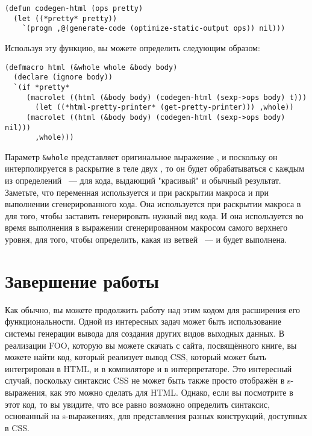 \begin{lstlisting}
(defun codegen-html (ops pretty)
  (let ((*pretty* pretty))
    `(progn ,@(generate-code (optimize-static-output ops)) nil)))
\end{lstlisting}

Используя эту функцию, вы можете определить  следующим образом:

\begin{lstlisting}
(defmacro html (&whole whole &body body)
  (declare (ignore body))
  `(if *pretty*
     (macrolet ((html (&body body) (codegen-html (sexp->ops body) t)))
       (let ((*html-pretty-printer* (get-pretty-printer))) ,whole))
     (macrolet ((html (&body body) (codegen-html (sexp->ops body) nil)))
       ,whole)))
\end{lstlisting}

Параметр \lstinline!&whole! представляет оригинальное выражение , и поскольку
он интерполируется в раскрытие в теле двух , то он будет обрабатываться с
каждым из определений ~--- для кода, выдающий "красивый" и обычный результат.
Заметьте, что переменная  используется и при раскрытии макроса и при
выполнении сгенерированного кода.  Она используется при раскрытии макроса в
 для того, чтобы заставить  генерировать нужный вид
кода.  И она используется во время выполнения в выражении  сгенерированном
макросом  самого верхнего уровня, для того, чтобы определить, какая из ветвей
~---  и  будет выполнена.

\section{Завершение работы}

Как обычно, вы можете продолжить работу над этим кодом для расширения его
функциональности.  Одной из интересных задач может быть использование системы генерации
вывода для создания других видов выходных данных.  В реализации FOO, которую вы можете
скачать с сайта, посвящённого книге, вы можете найти код, который реализует вывод CSS,
который может быть интегрирован в HTML, и в компиляторе и в интерпретаторе.  Это
интересный случай, поскольку синтаксис CSS не может быть также просто отображён в
s-выражения, как это можно сделать для HTML.  Однако, если вы посмотрите в этот код, то вы
увидите, что все равно возможно определить синтаксис, основанный на s-выражениях, для
представления разных конструкций, доступных в CSS.

